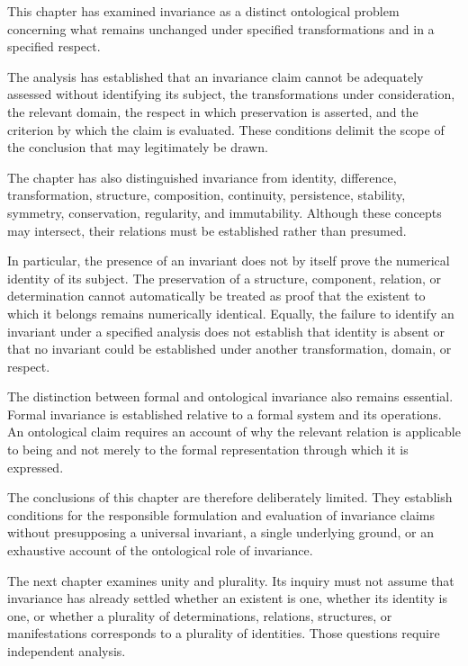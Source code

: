 This chapter has examined invariance as a distinct ontological
problem concerning what remains unchanged under specified
transformations and in a specified respect.

The analysis has established that an invariance claim cannot
be adequately assessed without identifying its subject,
the transformations under consideration, the relevant
domain, the respect in which preservation is asserted,
and the criterion by which the claim is evaluated. These
conditions delimit the scope of the conclusion that may
legitimately be drawn.

The chapter has also distinguished invariance from identity,
difference, transformation, structure, composition, continuity,
persistence, stability, symmetry, conservation, regularity,
and immutability. Although these concepts may intersect,
their relations must be established rather than presumed.

In particular, the presence of an invariant does not by
itself prove the numerical identity of its subject. The
preservation of a structure, component, relation, or
determination cannot automatically be treated as proof
that the existent to which it belongs remains numerically
identical. Equally, the failure to identify an invariant
under a specified analysis does not establish that identity
is absent or that no invariant could be established under
another transformation, domain, or respect.

The distinction between formal and ontological invariance
also remains essential. Formal invariance is established
relative to a formal system and its operations. An ontological
claim requires an account of why the relevant relation
is applicable to being and not merely to the formal
representation through which it is expressed.

The conclusions of this chapter are therefore deliberately
limited. They establish conditions for the responsible
formulation and evaluation of invariance claims without
presupposing a universal invariant, a single underlying
ground, or an exhaustive account of the ontological role
of invariance.

The next chapter examines unity and plurality. Its inquiry
must not assume that invariance has already settled whether
an existent is one, whether its identity is one, or whether
a plurality of determinations, relations, structures, or
manifestations corresponds to a plurality of identities.
Those questions require independent analysis.

